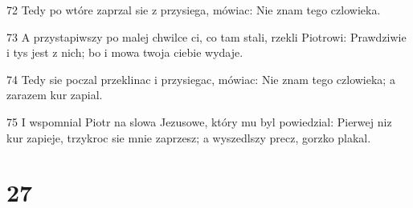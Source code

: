 \par 72 Tedy po wtóre zaprzal sie z przysiega, mówiac: Nie znam tego czlowieka.
\par 73 A przystapiwszy po malej chwilce ci, co tam stali, rzekli Piotrowi: Prawdziwie i tys jest z nich; bo i mowa twoja ciebie wydaje.
\par 74 Tedy sie poczal przeklinac i przysiegac, mówiac: Nie znam tego czlowieka; a zarazem kur zapial.
\par 75 I wspomnial Piotr na slowa Jezusowe, który mu byl powiedzial: Pierwej niz kur zapieje, trzykroc sie mnie zaprzesz; a wyszedlszy precz, gorzko plakal.

\chapter{27}


